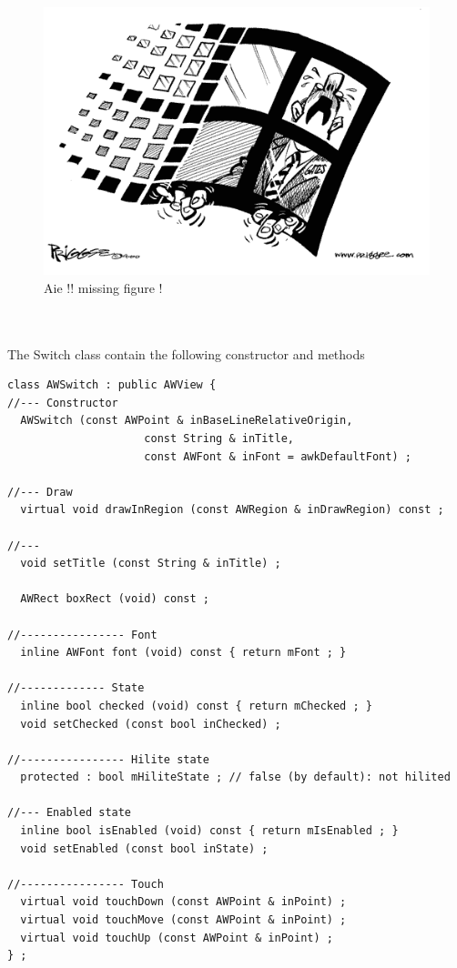 \documentclass[a4paper,11pt]{extarticle}
\begin{document}
\begin{figure}[htbp]
   \centering
   \includegraphics[scale=0.55]{AWFig.png} 
   \caption{Aie !! missing figure !}
   \label{fig:15 }
\end{figure}

~\\

~\\ The Switch class contain the following constructor and methods

\begin{lstlisting}[language=Arduinonl]
class AWSwitch : public AWView {
//--- Constructor
  AWSwitch (const AWPoint & inBaseLineRelativeOrigin,
                     const String & inTitle,
                     const AWFont & inFont = awkDefaultFont) ;

//--- Draw
  virtual void drawInRegion (const AWRegion & inDrawRegion) const ;

//---
  void setTitle (const String & inTitle) ;

  AWRect boxRect (void) const ;

//---------------- Font
  inline AWFont font (void) const { return mFont ; }

//------------- State
  inline bool checked (void) const { return mChecked ; }
  void setChecked (const bool inChecked) ;

//---------------- Hilite state
  protected : bool mHiliteState ; // false (by default): not hilited

//--- Enabled state
  inline bool isEnabled (void) const { return mIsEnabled ; }
  void setEnabled (const bool inState) ;

//---------------- Touch
  virtual void touchDown (const AWPoint & inPoint) ;
  virtual void touchMove (const AWPoint & inPoint) ;
  virtual void touchUp (const AWPoint & inPoint) ;
} ;
\end{lstlisting}
\end{document}
